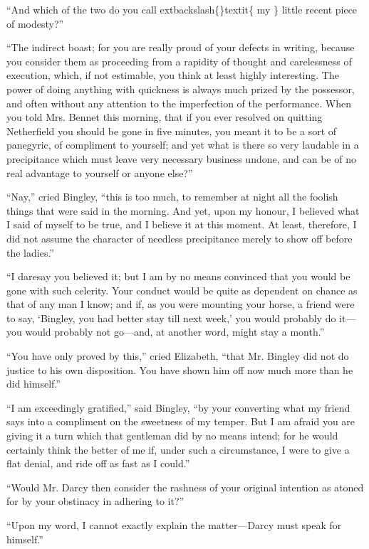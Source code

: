 \documentclass[10pt]{book}
\begin{document}
   “And which of the two do you call
   	extbackslash\{\}textit\{
    my
   \}
   little recent piece of modesty?”
  

   “The indirect boast; for you are really proud of your defects in
writing, because you consider them as proceeding from a rapidity of
thought and carelessness of execution, which, if not estimable, you
think at least highly interesting. The power of doing anything with
quickness is always much prized by the possessor, and often without any
attention to the imperfection of the performance. When you told Mrs.
Bennet this morning, that if you ever resolved on quitting Netherfield
you should be gone in five minutes, you meant it to be a sort of
panegyric, of compliment to yourself; and yet what is there so very
laudable in a precipitance which must leave very necessary business
undone, and can be of no real advantage to yourself or anyone else?”
  

   “Nay,” cried Bingley, “this is too much, to remember at night all the
foolish things that were said in the morning. And yet, upon my honour, I
believed what I
   said of myself to be true, and I believe it at this
moment. At least, therefore, I did not assume the character of needless
precipitance merely to show off before the ladies.”
  

   “I daresay you believed it; but I am by no means convinced that you
would be gone with such celerity. Your conduct would be quite as
dependent on chance as that of any man I know; and if, as you were
mounting your horse, a friend were to say, ‘Bingley, you had better stay
till next week,’ you would probably do it—you would probably not
go—and, at another word, might stay a month.”
  

   “You have only proved by this,” cried Elizabeth, “that Mr. Bingley did
not do justice to his own disposition. You have shown him off now much
more than he did himself.”
  

   “I am exceedingly gratified,” said Bingley, “by your converting what my
friend says into a compliment on the sweetness of my temper. But I am
afraid you are giving it a turn which that gentleman did by no means
intend; for he would certainly think the better of me if, under such a
circumstance, I were to give a flat denial, and ride off as fast as I
could.”
  

   “Would Mr. Darcy then consider the rashness of your original intention
as atoned for by your obstinacy in adhering to it?”
  

   “Upon my word, I cannot exactly explain the matter—Darcy must speak for
himself.”
  
\end{document}
